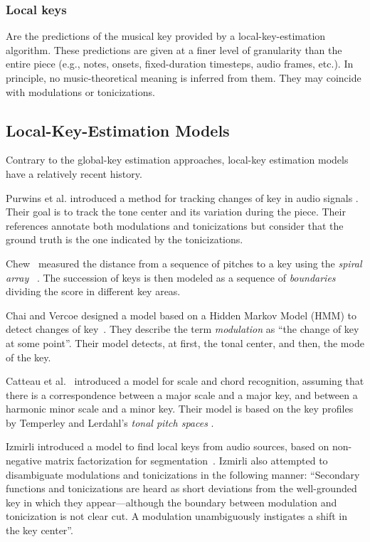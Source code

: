 \documentclass[sigconf]{acmart}
\begin{document}
\subsubsection{Local keys}
Are the predictions of the musical key provided by a local-key-estimation algorithm. 
These predictions are given at a finer level of granularity than the entire piece (e.g., notes, onsets, fixed-duration timesteps, audio frames, etc.).
In principle, no music-theoretical meaning is inferred from them. They may coincide with modulations or tonicizations.

\subsection{Local-Key-Estimation Models}\label{ssec:localkey}

Contrary to the global-key estimation approaches, local-key estimation models have a relatively recent history.

Purwins et al. introduced a method for tracking changes of key in audio signals %
\cite{purwins2000new}. 
Their goal is to track the tone center and its variation during the piece. Their references annotate both modulations and tonicizations but consider that the ground truth is the one indicated by the tonicizations.

Chew~\cite{chew2002key} measured the distance from a sequence of pitches to a key using the \emph{spiral array} ~\cite{chew2000towardsam}. 
The succession of keys is then modeled as a sequence of \emph{boundaries} dividing the score in different key areas.

Chai and Vercoe designed a model based on a Hidden Markov Model (HMM) to detect changes of key~\cite{chai2005detection}. 
They describe the term \emph{modulation} as ``the change of key at some point''. 
Their model detects, at first, the tonal center, and then, the mode of the key.

Catteau et al.~\cite{catteau07tonalkey} introduced a model for scale and chord recognition, assuming that there is a correspondence between a major scale and a major key, and between a harmonic minor scale and a minor key. Their model is based on the key profiles by Temperley \cite{temperley99tonality} and Lerdahl's \emph{tonal pitch spaces} \cite{lerdahl88tps}.

Izmirli introduced a model to find local keys from audio sources, based on non-negative matrix factorization for segmentation~\cite{izmirli2007localized}. 
Izmirli also attempted to disambiguate modulations and tonicizations in the following manner: ``Secondary functions and tonicizations are heard as short deviations from the well-grounded key in which they appear---although the boundary between modulation and tonicization is not clear cut. A modulation unambiguously instigates a shift in the key center''. 
\end{document}
